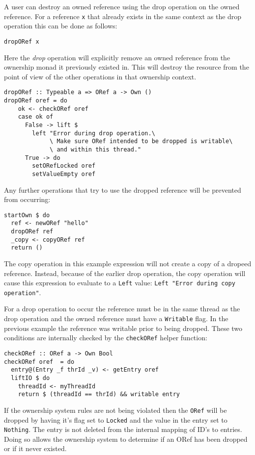 \documentclass[onehalf,11pt]{beavtex}
\begin{document}
A user can destroy an owned reference using the drop operation on the owned
reference. For a reference \texttt{x} that already exists in the same context
as the drop operation this can be done as follows:

\begin{verbatim}
dropORef x
\end{verbatim}

Here the \textit{drop} operation will explicitly remove an owned reference from
the ownership monad it previously existed in.
This will destroy the resource from the point of view of the other operations
in that ownership context.

\begin{verbatim}
dropORef :: Typeable a => ORef a -> Own ()
dropORef oref = do
    ok <- checkORef oref
    case ok of
      False -> lift $
        left "Error during drop operation.\
             \ Make sure ORef intended to be dropped is writable\
             \ and within this thread."
      True -> do
        setORefLocked oref
        setValueEmpty oref
\end{verbatim}

Any further operations that try to use the dropped reference will be prevented
from occurring:

\begin{lstlisting}
startOwn $ do
  ref <- newORef "hello"
  dropORef ref
  _copy <- copyORef ref
  return ()
\end{lstlisting}

The copy operation in this example expression will not create a copy of a
dropeed reference.
Instead, because of the earlier drop operation, the copy operation will cause
this expression to evaluate to a \texttt{Left}
value: \texttt{Left "Error during copy operation"}. 

For a drop operation to occur the reference must be in the same thread as the
drop operation and the owned reference must have a \texttt{Writable} flag.
In the previous example the reference was writable prior to being dropped.
These two conditions are internally checked by the \texttt{checkORef} helper
function:

\begin{verbatim}
checkORef :: ORef a -> Own Bool
checkORef oref  = do
  entry@(Entry _f thrId _v) <- getEntry oref
  liftIO $ do
    threadId <- myThreadId
    return $ (threadId == thrId) && writable entry
\end{verbatim}

If the ownership system rules are not being violated then the \texttt{ORef}
will be dropped by having it's flag set to \texttt{Locked} and the value in the
entry set to \texttt{Nothing}.
The entry is not deleted from the internal mapping of
ID's to entries. Doing so allows the ownership system to determine if an ORef
has been dropped or if it never existed.
\end{document}
